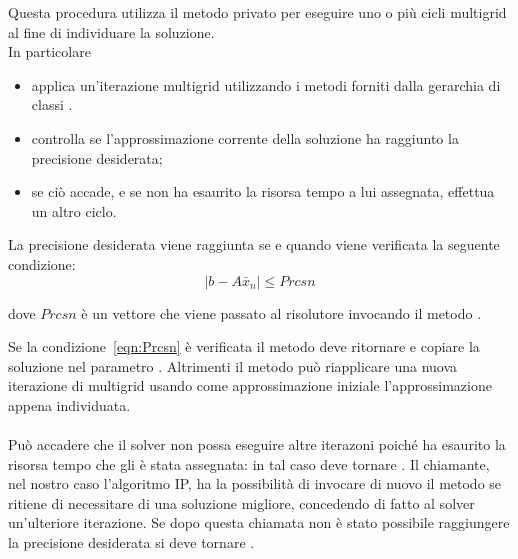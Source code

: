 Questa procedura utilizza il metodo privato  per eseguire uno o più cicli multigrid al fine di individuare la soluzione.\\
In particolare
\begin{itemize}
\item applica un'iterazione multigrid utilizzando i metodi forniti dalla gerarchia di classi .
\item controlla se l'approssimazione corrente della soluzione ha raggiunto la precisione desiderata;
\item se ciò accade, e se non ha esaurito la risorsa tempo a lui assegnata, effettua un altro ciclo.
\end{itemize}

La precisione desiderata viene raggiunta se e quando viene verificata la seguente condizione:
\begin{equation}
\label{eqn:Prcsn}
|b - A\bar{x}_n | \leq Prcsn
\end{equation}

dove $Prcsn$ è un vettore che viene passato al risolutore invocando il metodo .

Se la condizione~\eqref{eqn:Prcsn} è verificata il metodo deve ritornare  e copiare la soluzione nel parametro .
Altrimenti il metodo può riapplicare una nuova iterazione di multigrid usando come approssimazione iniziale l'approssimazione appena individuata.\\
\\
Può accadere che il solver non possa eseguire altre iterazoni poiché ha esaurito la risorsa tempo che gli è stata assegnata: in tal caso deve tornare .
Il chiamante, nel nostro caso l'algoritmo IP, ha la possibilità di invocare di nuovo il metodo  se ritiene di necessitare di una soluzione migliore, concedendo di fatto al solver un'ulteriore iterazione.
Se dopo questa chiamata non è stato possibile raggiungere la precisione desiderata si deve tornare .

